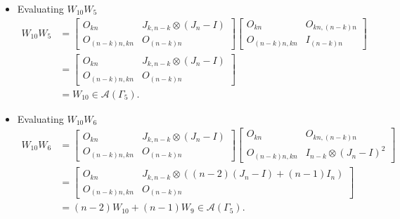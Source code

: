 \begin{itemize}
\item Evaluating $W_{10}W_{5}$
\begin{align*}
    W_{10}W_5
    &= \begin{bmatrix}
        O_{kn} & J_{k,n-k} \otimes (J_n-I) \\
        O_{(n-k)n,kn} & O_{(n-k)n}
    \end{bmatrix}\begin{bmatrix}
        O_{kn} & O_{kn, (n-k)n} \\
        O_{(n-k)n,kn} & I_{(n - k)n}
    \end{bmatrix}\\
    &= \begin{bmatrix}
        O_{kn} & J_{k,n-k} \otimes (J_n-I) \\
        O_{(n-k)n,kn} & O_{(n-k)n}
    \end{bmatrix}\\
    &=W_{10}\in\mathcal{A}(\Gamma_5).
\end{align*}

\item Evaluating $W_{10}W_{6}$
\begin{align*}
    W_{10}W_6
    &= \begin{bmatrix}
        O_{kn} & J_{k,n-k} \otimes (J_n-I) \\
        O_{(n-k)n,kn} & O_{(n-k)n}
    \end{bmatrix}\begin{bmatrix}
        O_{kn} & O_{kn, (n-k)n} \\
        O_{(n-k)n,kn} & I_{n-k} \otimes (J_n-I)^2
    \end{bmatrix}\\
    &= \begin{bmatrix}
        O_{kn} & J_{k,n-k} \otimes ((n-2)(J_n-I) + (n-1)I_n) \\
        O_{(n-k)n,kn} & O_{(n-k)n}
    \end{bmatrix}\\
    &=(n-2)W_{10} + (n-1)W_9\in\mathcal{A}(\Gamma_5).
\end{align*}


\end{itemize}
